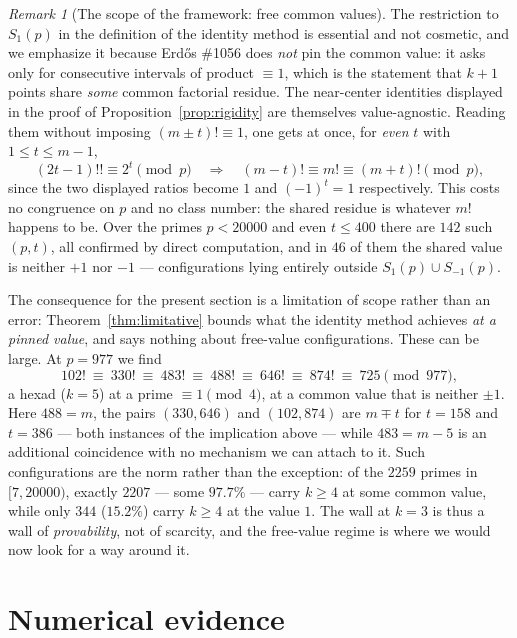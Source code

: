 \documentclass[11pt]{article}
\theoremstyle{definition}
\theoremstyle{remark}
\newtheorem{remark}[theorem]{Remark}
\begin{document}
\begin{remark}[The scope of the framework: free common values]
\label{rem:freevalue}
The restriction to $S_1(p)$ in the definition of the identity method is
essential and not cosmetic, and we emphasize it because Erd\H{o}s \#1056
does \emph{not} pin the common value: it asks only for consecutive intervals
of product $\equiv 1$, which is the statement that $k+1$ points share
\emph{some} common factorial residue. The near-center identities displayed
in the proof of Proposition~\ref{prop:rigidity} are themselves
value-agnostic. Reading them without imposing $(m \pm t)! \equiv 1$, one
gets at once, for \emph{even} $t$ with $1 \le t \le m-1$,
\[
  (2t-1)!! \equiv 2^t \pmod p
  \quad\Longrightarrow\quad
  (m-t)! \equiv m! \equiv (m+t)! \pmod p,
\]
since the two displayed ratios become $1$ and $(-1)^t = 1$ respectively.
This costs no congruence on $p$ and no class number: the shared residue is
whatever $m!$ happens to be. Over the primes $p < 20000$ and even
$t \le 400$ there are $142$ such $(p, t)$, all confirmed by direct
computation, and in $46$ of them the shared value is neither $+1$ nor $-1$
--- configurations lying entirely outside $S_1(p) \cup S_{-1}(p)$.

The consequence for the present section is a limitation of scope rather than
an error: Theorem~\ref{thm:limitative} bounds what the identity method
achieves \emph{at a pinned value}, and says nothing about free-value
configurations. These can be large. At $p = 977$ we find
\[
  102!\ \equiv\ 330!\ \equiv\ 483!\ \equiv\ 488!\ \equiv\ 646!\ \equiv\
  874!\ \equiv\ 725 \pmod{977},
\]
a hexad ($k = 5$) at a prime $\equiv 1 \pmod 4$, at a common value that is
neither $\pm 1$. Here $488 = m$, the pairs $(330, 646)$ and $(102, 874)$ are
$m \mp t$ for $t = 158$ and $t = 386$ --- both instances of the implication
above --- while $483 = m - 5$ is an additional coincidence with no mechanism
we can attach to it. Such configurations are the norm rather than the
exception: of the $2259$ primes in $[7, 20000)$, exactly $2207$ --- some
$97.7\%$ --- carry $k \ge 4$ at some common value, while only $344$
($15.2\%$) carry $k \ge 4$ at the value $1$. The wall at $k = 3$ is thus a
wall of \emph{provability}, not of scarcity, and the free-value regime is
where we would now look for a way around it.
\end{remark}

\section{Numerical evidence}\label{sec:numerics}
\end{document}
